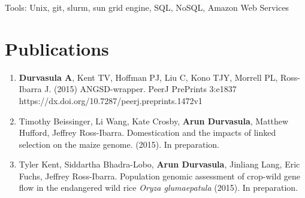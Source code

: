 \documentclass[letterpaper]{article}
\renewenvironment{itemize}{
  \begin{list}{}{
    \setlength{\leftmargin}{1em}
  }
}{
  \end{list}
}
\begin{document}
\begin{itemize}
\item Tools: Unix, git, slurm, sun grid engine, SQL, NoSQL, Amazon Web Services
\end{itemize}


\setlength\parskip{0.15em}

\section*{Publications}
\begin{enumerate}[leftmargin=!,labelindent=5pt,itemindent=-15pt]
\item {\bf Durvasula A}, Kent TV, Hoffman PJ, Liu C, Kono TJY, Morrell PL, Ross-Ibarra J. (2015) ANGSD-wrapper. PeerJ PrePrints 3:e1837 https://dx.doi.org/10.7287/peerj.preprints.1472v1
\item Timothy Beissinger, Li Wang, Kate Crosby, {\bf Arun Durvasula}, Matthew Hufford, Jeffrey Ross-Ibarra. Domestication and the impacts of linked selection on the maize genome. (2015). In preparation.
\item Tyler Kent, Siddartha Bhadra-Lobo, {\bf Arun Durvasula}, Jinliang Lang, Eric Fuchs, Jeffrey Ross-Ibarra. Population genomic assessment of crop-wild gene flow in the endangered wild rice \emph{Oryza glumaepatula} (2015). In preparation.
\end{enumerate}
\end{document}
